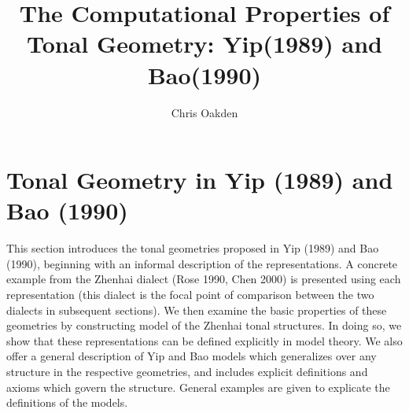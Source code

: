 \documentclass{article}
\title{The Computational Properties of Tonal Geometry: Yip(1989) and Bao(1990)}
\author{Chris Oakden}
\begin{document}
\maketitle
\section{Tonal Geometry in Yip (1989) and Bao (1990)}
This section introduces the tonal geometries proposed in Yip (1989) and Bao (1990), beginning with an informal description of the representations. A concrete example from the Zhenhai dialect (Rose 1990, Chen 2000) is presented using each representation (this dialect is the focal point of comparison between the two dialects in subsequent sections). We then examine the basic properties of these geometries by constructing model of the Zhenhai tonal structures. In doing so, we show that these representations can be defined explicitly in model theory. We also offer a general description of Yip and Bao models which generalizes over any structure in the respective geometries, and includes explicit definitions and axioms which govern the structure. General examples are given to explicate the definitions of the models. 
\end{document}

